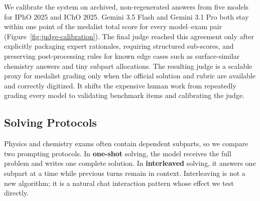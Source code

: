 \documentclass[11pt]{article}
\begin{document}
We calibrate the system on archived, non-regenerated answers from five models for IPhO 2025 and IChO 2025.
Gemini 3.5 Flash and Gemini 3.1 Pro both stay within one point of the medalist total score for every model--exam pair (Figure~\ref{fig:judge-calibration}).
The final judge reached this agreement only after explicitly packaging expert rationales, requiring structured sub-scores, and preserving post-processing rules for known edge cases such as surface-similar chemistry answers and tiny subpart allocations. The resulting judge is a scalable proxy for medalist grading only when the official solution and rubric are available and correctly digitized.
It shifts the expensive human work from repeatedly grading every model to validating benchmark items and calibrating the judge.







\subsection{Solving Protocols}
\label{sec:solving-protocols}
Physics and chemistry exams often contain dependent subparts, so we compare two prompting protocols.
In \textbf{one-shot} solving, the model receives the full problem and writes one complete solution.
In \textbf{interleaved} solving, it answers one subpart at a time while previous turns remain in context.
Interleaving is not a new algorithm; it is a natural chat interaction pattern whose effect we test directly.
\end{document}
